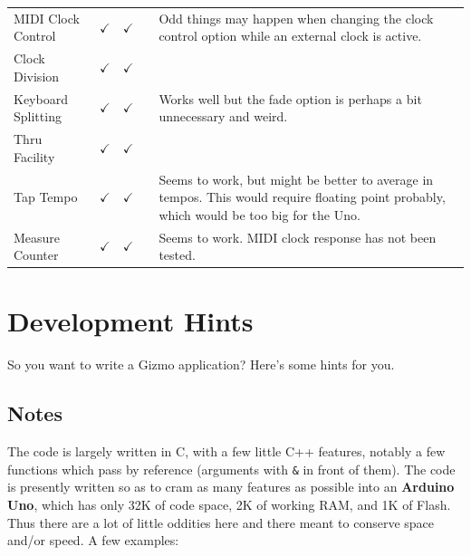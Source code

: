 \documentclass{article}
\begin{document}
\begin{center}
{\begin{tabular}{@{}llllp{2.8in}@{}}
MIDI Clock Control& $\checkmark$ & $\checkmark$ & &Odd things may happen when changing the clock control option while an external clock is active.\\
Clock Division&$\checkmark$&$\checkmark$& &\\
Keyboard Splitting& $\checkmark$ & $\checkmark$  & & Works well but the fade option is perhaps a bit unnecessary and weird.\\
Thru Facility & $\checkmark$ & $\checkmark$ & & \\
Tap Tempo & $\checkmark$ & $\checkmark$& & Seems to work, but might be better to average in tempos.  This would require floating point probably, which would be too big for the Uno.\\
Measure Counter & $\checkmark$ & $\checkmark$& & Seems to work.  MIDI clock response has not been tested.
\end{tabular}
}
\end{center}




\section{Development Hints}

So you want to write a Gizmo application?  Here's some hints for you.

\subsection{Notes}

The code is largely written in C, with a few little C++ features, notably
a few functions which pass by reference (arguments with \texttt{\&} in front of them).  The
code is presently written so as to cram as many features as possible into an
{\bf Arduino Uno}, which has only 32K of code space, 2K of working RAM, and 1K of Flash.  
Thus there are a lot of little oddities here and there meant to conserve space and/or
speed.  A few examples:
\end{document}
